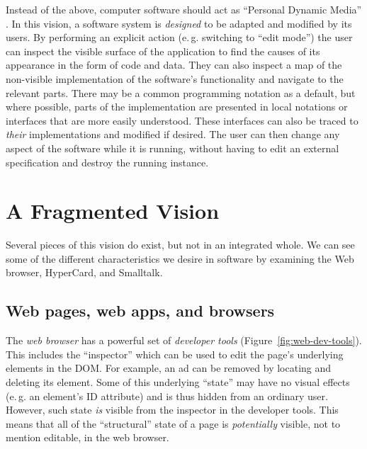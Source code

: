 \documentclass[ twoside,openright,titlepage,numbers=noenddot,headinclude,footinclude,cleardoublepage=empty,abstract=on,
                BCOR=5mm,paper=a4,fontsize=11pt
                ]{scrreprt}
\newcommand{\eg}{e.\,g.}
\theoremstyle{definition}
\begin{document}
Instead of the above, computer software should act as ``Personal Dynamic
Media'' \parencite{PersonalDynMedia}. In this vision, a software system
is \emph{designed} to be adapted and modified by its users. By
performing an explicit action (\eg{} switching to ``edit mode'') the
user can inspect the visible surface of the application to find the
causes of its appearance in the form of code and data. They can also
inspect a map of the non-visible implementation of the software's
functionality and navigate to the relevant parts. There may be a common
programming notation as a default, but where possible, parts of the
implementation are presented in local notations or interfaces that are
more easily understood. These interfaces can also be traced to
\emph{their} implementations and modified if desired. The user can then
change any aspect of the software while it is running, without having to
edit an external specification and destroy the running instance.

\hypertarget{a-fragmented-vision}{\section{A Fragmented Vision}\label{a-fragmented-vision}}

Several pieces of this vision do exist, but not in an integrated whole.
We can see some of the different characteristics we desire in software
by examining the Web browser, HyperCard, and Smalltalk.

\hypertarget{web-pages-web-apps-and-browsers}{\subsection{Web pages, web apps, and
browsers}\label{web-pages-web-apps-and-browsers}}

The \emph{web browser} has a powerful set of \emph{developer tools}
(Figure~\ref{fig:web-dev-tools}). This includes the ``inspector'' which
can be used to edit the page's underlying elements in the \ac{DOM}. For
example, an ad can be removed by locating and deleting its element. Some
of this underlying ``state'' may have no visual effects (\eg{} an
element's ID attribute) and is thus hidden from an ordinary user.
However, such state \emph{is} visible from the inspector in the
developer tools. This means that all of the ``structural'' state of a
page is \emph{potentially} visible, not to mention editable, in the web
browser.
\end{document}
